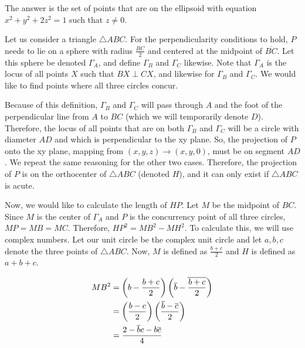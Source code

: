\documentclass[10pt]{../usamts}
\begin{document}
\begin{solution}
The answer is the set of points that are on the ellipsoid with equation $x^2 + y^2 + 2z^2 = 1$ such that $z \neq 0$.

Let us consider a triangle $\triangle ABC$. For the perpendicularity conditions to hold, $P$ needs to lie on a sphere with radius $\frac{BC}{2}$ and centered at the midpoint of $\overline{BC}$. Let this sphere be denoted $\Gamma_A$, and define $\Gamma_B$ and $\Gamma_C$ likewise. Note that $\Gamma_A$ is the locus of all points $X$ such that $BX \perp CX$, and likewise for $\Gamma_B$ and $\Gamma_C$. We would like to find points where all three circles concur.

Because of this definition, $\Gamma_B$ and $\Gamma_C$ will pass through $A$ and the foot of the perpendicular line from $A$ to $BC$ (which we will temporarily denote $D$). Therefore, the locus of all points that are on both $\Gamma_B$ and $\Gamma_C$ will be a circle with diameter $AD$ and which is perpendicular to the xy plane. So, the projection of $P$ onto the xy plane, mapping from $(x,y,z) \rightarrow (x,y,0)$, must be on segment $AD$. We repeat the same reasoning for the other two cases. Therefore, the projection of $P$ is on the orthocenter of $\triangle ABC$ (denoted $H$), and it can only exist if $\triangle ABC$ is acute.

Now, we would like to calculate the length of $HP$. Let $M$ be the midpoint of $BC$. Since $M$ is the center of $\Gamma_A$ and $P$ is the concurrency point of all three circles, $MP = MB = MC$. Therefore, $HP^2 = MB^2 - MH^2$. To calculate this, we will use complex numbers. Let our unit circle be the complex unit circle and let $a,b,c$ denote the three points of $\triangle ABC$. Now, $M$ is defined as $\frac{b+c}{2}$ and $H$ is defined as $a+b+c$.

\newcommand{\ol}{\overline}

\begin{align*}
    MB^2 &= \paren{b - \frac{b+c}{2}}\paren{\ol{b} - \ol{\frac{b+c}{2}}}\\
         &= \paren{\frac{b-c}{2}}\paren{\frac{\ol{b}-\ol{c}}{2}}\\
         &=\frac{2-\ol{b}c-b\ol{c}}{4}\\
\end{align*}


\end{solution}
\end{document}
